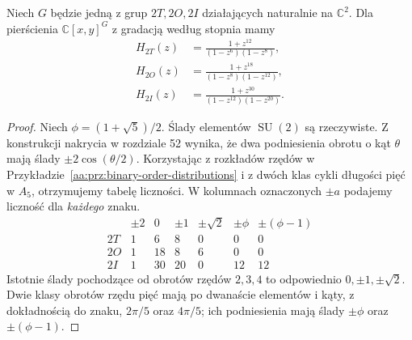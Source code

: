 \begin{twierdzenie}
\label{aa:tw:exceptional-hilbert}
Niech $G$ będzie jedną z grup $2T,2O,2I$ działających
naturalnie na $\mathbb C^2$. Dla pierścienia
$\mathbb C[x,y]^G$ z gradacją według stopnia mamy
\[
\begin{aligned}
 H_{2T}(z)&=\frac{1+z^{12}}{(1-z^6)(1-z^8)},\\
 H_{2O}(z)&=\frac{1+z^{18}}{(1-z^8)(1-z^{12})},\\
 H_{2I}(z)&=\frac{1+z^{30}}{(1-z^{12})(1-z^{20})}.
\end{aligned}
\]
\end{twierdzenie}
\begin{proof}
Niech $\phi=(1+\sqrt5)/2$. Ślady elementów
$\operatorname{SU}(2)$ są rzeczywiste.
Z konstrukcji nakrycia w rozdziale 52 wynika,
że dwa podniesienia obrotu o kąt $\theta$
mają ślady $\pm2\cos(\theta/2)$.
Korzystając z rozkładów rzędów w
Przykładzie~\ref{aa:prz:binary-order-distributions}
i z dwóch klas cykli długości pięć w $A_5$,
otrzymujemy tabelę liczności. W kolumnach oznaczonych
$\pm a$ podajemy liczność dla \emph{każdego} znaku.
\[
\begin{array}{c|rrrrrr}
 &\pm2&0&\pm1&\pm\sqrt2&\pm\phi&\pm(\phi-1)\\ \hline
2T&1&6&8&0&0&0\\
2O&1&18&8&6&0&0\\
2I&1&30&20&0&12&12
\end{array}
\]
Istotnie ślady pochodzące od obrotów rzędów
$2,3,4$ to odpowiednio $0,\pm1,\pm\sqrt2$.
Dwie klasy obrotów rzędu pięć mają po dwanaście
elementów i kąty, z dokładnością do znaku,
$2\pi/5$ oraz $4\pi/5$; ich podniesienia mają ślady
$\pm\phi$ oraz $\pm(\phi-1)$.


\end{proof}
